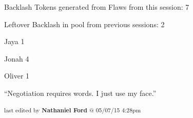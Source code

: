 Backlash Tokens generated from Flaws from this session: 7

Leftover Backlash in pool from previous sessions: 2


Jaya 1

Jonah 4

Oliver 1



``Negotiation requires words.  I just use my face.''




\vspace{\fill}

\begin{flushright}
\textsubscript{last edited by \textbf{Nathaniel Ford} @ 05/07/15 4:28pm}
\end{flushright}

